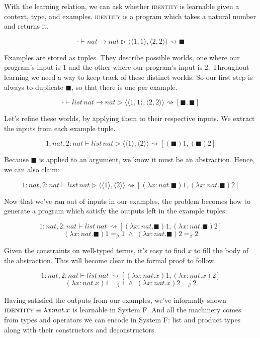\documentclass[acmsmall]{acmart}
\newcommand{\lam}{\lambda}
\theoremstyle{mytheoremstyle}
\begin{document}
With the learning relation, we can ask whether \textsc{identity} is learnable given a context, type, and examples. \textsc{identity} is a program which takes a natural number and returns it. \vspace{-1.0em}
\begin{singlespace}
$$\cdot \vdash nat \!\to\! nat \rhd \langle\langle1,1\rangle,\langle2,2\rangle\rangle \rightsquigarrow \blacksquare$$
\end{singlespace}
Examples are stored as tuples. They describe possible worlds, one where our program's input is 1 and the other where our program's input is 2. Throughout learning we need a way to keep track of these distinct worlds. So our first step is always to duplicate $\blacksquare$, so that there is one per example. \vspace{-1.0em}
\begin{singlespace}
$$\cdot \vdash list \,nat \!\to\! nat \rhd \langle\langle1,1\rangle,\langle2,2\rangle\rangle \rightsquigarrow [\blacksquare, \blacksquare]$$
\end{singlespace}
Let's refine these worlds, by applying them to their respective inputs. We extract the inputs from each example tuple.\vspace{-1.0em}
\begin{singlespace}
$$1{:}nat, 2{:}nat \vdash list \,nat \rhd \langle\langle1\rangle,\langle2\rangle\rangle \rightsquigarrow [(\blacksquare)1, (\blacksquare)2]$$
\end{singlespace}
Because $\blacksquare$ is applied to an argument, we know it must be an abstraction. Hence, we can also claim: \vspace{-1.0em}
\begin{singlespace}
$$1{:}nat, 2{:}nat \vdash list \,nat \rhd \langle\langle1\rangle,\langle2\rangle\rangle \rightsquigarrow [(\lam x{:}nat.\blacksquare)1, (\lam x{:}nat.\blacksquare)2]$$
\end{singlespace}
Now that we've ran out of inputs in our examples, the problem becomes how to generate a program which satisfy the outputs left in the example tuples:\vspace{-1.0em}
\begin{singlespace}
$$1{:}nat, 2{:}nat \vdash list \,nat\, \rightsquigarrow [(\lam x{:}nat.\blacksquare)1, (\lam x{:}nat.\blacksquare)2]$$
$$(\lam x{:}nat.\blacksquare)1 =_\beta 1\;\land\;(\lam x{:}nat.\blacksquare)2=_\beta2$$
\end{singlespace}
Given the constraints on well-typed terms, it's easy to find $x$ to fill the body of the abstraction. This will become clear in the formal proof to follow. \vspace{-1.0em}
\begin{singlespace}
$$1{:}nat, 2{:}nat \vdash list \,nat\, \rightsquigarrow [(\lam x{:}nat.x)1, (\lam x{:}nat.x)2]$$
$$(\lam x{:}nat.x)1 =_\beta 1\;\land\;(\lam x{:}nat.x)2=_\beta2$$
\end{singlespace}
Having satisfied the outputs from our examples, we've informally shown $\textsc{identity} \equiv \lam x{:}nat.x$ is learnable in System F. And all the machinery comes from types and operators we can encode in System F: list and product types along with their constructors and deconstructors.
\end{document}
